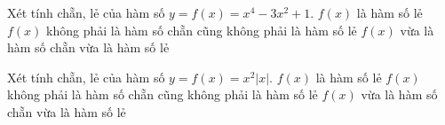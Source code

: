 \begin{ex}%
	Xét tính chẵn, lẻ của hàm số  $y = f(x)=x^4- 3x^2 + 1$.
	{$f(x)$ là hàm số lẻ}
	{$f(x)$ không phải là hàm số chẵn cũng không phải là hàm số lẻ}
	{$f(x)$ vừa là hàm số chẵn vừa là hàm số lẻ}
\end{ex}
\begin{ex}%
	Xét tính chẵn, lẻ của hàm số  $y = f(x) = x^2|x|$.
	{$f(x)$ là hàm số lẻ}
	{$f(x)$ không phải là hàm số chẵn cũng không phải là hàm số lẻ}
	{$f(x)$ vừa là hàm số chẵn vừa là hàm số lẻ}
\end{ex}

